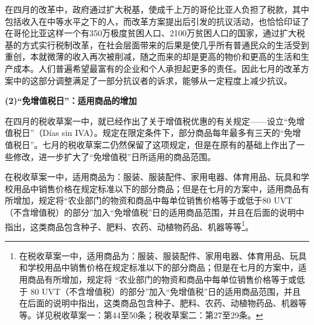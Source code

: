 \documentclass{phyasgn}\usepackage{nag}
\begin{document}
\par 在四月的改革中，政府通过扩大税基，使成千上万的哥伦比亚人负担了税款，其中包括收入在中等水平之下的人，而改革方案提出后引发的抗议活动，也恰恰印证了在哥伦比亚这样一个有350万极度贫困人口、2100万贫困人口的国家，通过扩大税基的方式实行税制改革，在社会层面带来的后果是使几乎所有普通民众的生活受到重创，本就微薄的收入再次被削减，随之而来的却是更高的物价和更高的生活和生产成本。人们普遍希望最富有的企业和个人承担起更多的责任。因此七月的改革方案中的这部分调整满足了一部分抗议者的诉求，能够从一定程度上减少抗议。
\par \textbf{(2)“免增值税日”：适用商品的增加}
\par 在四月的税收草案一中，就已经作出了关于增值税优惠的有关规定——设立“免增值税日”（Días sin IVA）。规定在限定条件下，部分商品每年最多有三天的“免增值税日”。七月的税收草案二仍然保留了这项规定，但是在原有的基础上作出了一些修改，进一步扩大了“免增值税”日所适用的商品范围。
\par 在税收草案一中，适用商品为：服装、服装配件、家用电器、体育用品、玩具和学校用品中销售价格在规定标准以下的部分商品；但是在七月的方案中，适用商品有所增加，规定将“农业部门的物资和商品中每单位销售价格等于或低于80 UVT（不含增值税）的部分”加入“免增值税”日的适用商品范围，并且在后面的说明中指出，这类商品包含种子、肥料、农药、动植物药品、机器等等\footnote[27]{在税收草案一中，适用商品为：服装、服装配件、家用电器、体育用品、玩具和学校用品中销售价格在规定标准以下的部分商品；但是在七月的方案中，适用商品有所增加，规定将 “农业部门的物资和商品中每单位销售价格等于或低于 80 UVT（不含增值税）的部分”加入“免增值税”日的适用商品范围，并且在后面的说明中指出，这类商品包含种子、肥料、农药、动植物药品、机器等等。详见税收草案一：第44至50条；税收草案二：第27至29条。}。
\end{document}
